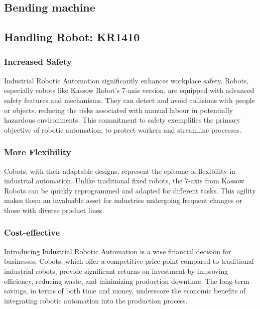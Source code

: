 \subsection{Bending machine}


\subsection{Handling Robot: KR1410}

    \subsubsection{Increased Safety}

    Industrial Robotic Automation significantly enhances workplace safety. Robots, especially cobots like Kassow Robot's 7-axis version, are equipped with advanced safety features and mechanisms. 
    They can detect and avoid collisions with people or objects, reducing the risks associated with manual labour in potentially hazardous environments. This commitment to safety exemplifies the primary objective of robotic automation: to protect workers and streamline processes.

    \subsubsection{More Flexibility}
    Cobots, with their adaptable designs, represent the epitome of flexibility in industrial automation. 
    Unlike traditional fixed robots, the 7-axis from Kassow Robots can be quickly reprogrammed and adapted for different tasks. This agility makes them an invaluable asset for industries undergoing frequent changes or those with diverse product lines.

    \subsubsection{Cost-effective}
    Introducing Industrial Robotic Automation is a wise financial decision for businesses. Cobots, which offer a competitive price point compared to traditional industrial robots, provide significant returns on investment by improving efficiency, reducing waste, and minimizing production downtime. 
    The long-term savings, in terms of both time and money, underscore the economic benefits of integrating robotic automation into the production process.

